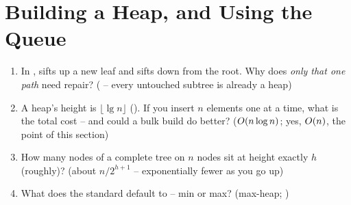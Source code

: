 \section{Building a Heap, and Using the Queue}\label{sec:c07-build}

\begin{previouslybox}
\begin{enumerate}[nosep, leftmargin=1.6em]
  \item In ,  sifts up a new leaf and  sifts down from the root.
        Why does \emph{only that one path} need repair? ( -- every untouched subtree is
        already a heap)
  \item A heap's height is $\lfloor\lg n\rfloor$ (). If you insert $n$ elements one at a
        time, what is the total cost -- and could a bulk build do better? ($O(n\log n)$; yes, $O(n)$,
        the point of this section)
  \item How many nodes of a complete tree on $n$ nodes sit at height exactly $h$ (roughly)? (about
        $n/2^{h+1}$ -- exponentially fewer as you go up)
  \item What does the standard  default to -- min or max? (max-heap; )
\end{enumerate}
\end{previouslybox}

